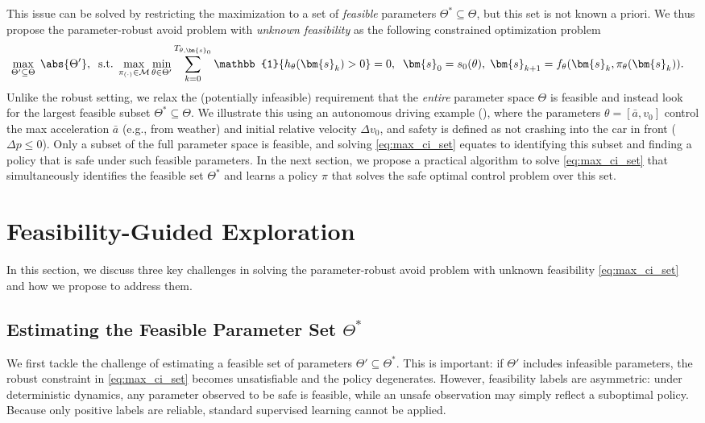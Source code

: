 \documentclass{article} %
\def\vb{{\bm{b}}}
\def\vx{{\bm{x}}}
\let\Cref\crtCref
\newcommand{\CISet}{\Theta^*}
\newcommand{\ind}{\mathbb{1}}
\def\vx{{\vb{x}}}
\def\vx{{\bm{s}}}
\begin{document}
This issue can be solved by restricting the maximization to a set of \emph{feasible} parameters $\Theta^*\subseteq \Theta$,
but this set is not known a priori.
We thus propose the parameter-robust avoid problem with \textit{unknown feasibility} as the following constrained optimization problem
\begin{equation} \label{eq:max_ci_set}
    \hspace{-1em}
    \max_{\Theta' \subseteq \Theta} \; \abs{ \Theta' }, \;\;
    \text{s.t.} \; \max_{\pi_{(\cdot)} \in \mathcal{M}} \min_{\theta \in \Theta'} \sum_{k=0}^{T_{\theta,\vx_0}} \ind\{h_\theta(\vx_k) > 0\} = 0,
    \;\; \vx_0=s_0(\theta),\; \vx_{k+1} = f_\theta(\vx_k, \pi_\theta(\vx_k)).
\end{equation}
Unlike the robust setting,
we relax the (potentially infeasible) requirement that the \textit{entire} parameter space $\Theta$ is feasible and instead look for the largest feasible subset $\Theta^* \subseteq \Theta$.
We illustrate this using an autonomous driving example (\Cref{fig:acc}), where the parameters $\theta = [\bar{a}, v_0]$ control the max acceleration $\bar{a}$ (e.g., from weather) and initial relative velocity $\Delta v_0$,
and safety is defined as not crashing into the car in front ($\Delta p \leq 0$).
Only a subset of the full parameter space is feasible, and solving \eqref{eq:max_ci_set} equates to identifying this subset and finding a policy that is safe under such feasible parameters.
In the next section, we propose a practical algorithm to solve \eqref{eq:max_ci_set} that simultaneously identifies the feasible set $\Theta^*$ and learns a policy $\pi$ that solves the safe optimal control problem over this set.

\section{Feasibility-Guided Exploration}

In this section, we discuss three key challenges in solving the parameter-robust avoid problem with unknown feasibility \eqref{eq:max_ci_set} and how we propose to address them.

\subsection{Estimating the Feasible Parameter Set \texorpdfstring{$\CISet$}{}} \label{sec:classifier}

We first tackle the challenge of estimating a feasible set of parameters $\Theta' \subseteq \CISet$.
This is important: if $\Theta'$ includes infeasible parameters, the robust constraint in \eqref{eq:max_ci_set} becomes unsatisfiable and the policy degenerates.
However, feasibility labels are asymmetric: under deterministic dynamics, any parameter observed to be safe is feasible, while an unsafe observation may simply reflect a suboptimal policy.
Because only positive labels are reliable, standard supervised learning cannot be applied.
\end{document}
